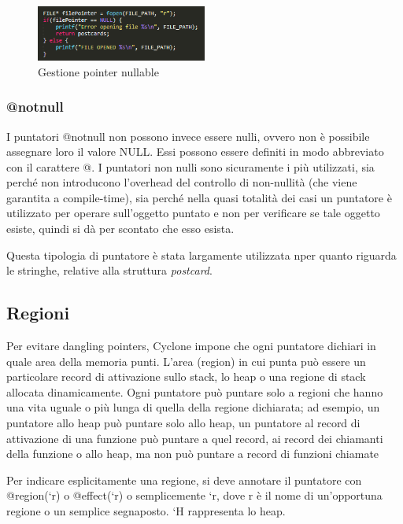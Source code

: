 \begin{figure}[h]
	\centering
	\includegraphics[width=0.5\textwidth]{Immagini/NullablePointerFile.png}
	\caption{Gestione pointer nullable}
	\label{fig:nullable}
\end{figure}

\subsubsection{@notnull}
I puntatori @notnull non possono invece essere nulli, ovvero non è possibile assegnare loro il
valore NULL. Essi possono essere definiti in modo abbreviato con il carattere @.
I puntatori non nulli sono sicuramente i più utilizzati, sia perché non introducono l’overhead
del controllo di non-nullità (che viene garantita a compile-time), sia perché nella quasi totalità
dei casi un puntatore è utilizzato per operare sull’oggetto puntato e non per verificare se tale
oggetto esiste, quindi si dà per scontato che esso esista.

Questa tipologia di puntatore è stata largamente utilizzata nper quanto riguarda le stringhe, relative alla struttura \textit{postcard}.

\subsection{Regioni}
\label{sec:regions}
Per evitare dangling pointers, Cyclone impone che ogni puntatore dichiari in quale area della
memoria punti. L’area (region) in cui punta può essere un particolare record di attivazione
sullo stack, lo heap o una regione di stack allocata dinamicamente. Ogni puntatore può puntare
solo a regioni che hanno una vita uguale o più lunga di quella della regione dichiarata; ad
esempio, un puntatore allo heap può puntare solo allo heap, un puntatore al record di
attivazione di una funzione può puntare a quel record, ai record dei chiamanti della funzione o
allo heap, ma non può puntare a record di funzioni chiamate

Per indicare esplicitamente una regione, si deve annotare il puntatore con @region(`r) o
@effect(`r) o semplicemente `r, dove r è il nome di un’opportuna regione o un semplice
segnaposto. `H rappresenta lo heap.